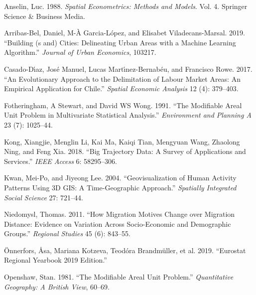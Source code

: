 \documentclass[
  letterpaper,
  krantz2]{style/krantz}
\newlength{\cslhangindent}
\newlength{\cslentryspacingunit} %
\newenvironment{CSLReferences}[2] %
 {%
  \setlength{\parindent}{0pt}
  \ifodd #1
  \let\oldpar\par
  \def\par{\hangindent=\cslhangindent\oldpar}
  \fi
  \setlength{\parskip}{#2\cslentryspacingunit}
 }%
 {}
\begin{document}
\hypertarget{refs}{}
\begin{CSLReferences}{1}{0}
\leavevmode{}%
Anselin, Luc. 1988. \emph{Spatial Econometrics: Methods and Models}.
Vol. 4. Springer Science \& Business Media.

\leavevmode{}%
Arribas-Bel, Daniel, M-À Garcia-López, and Elisabet Viladecans-Marsal.
2019. {``Building (s and) Cities: Delineating Urban Areas with a Machine
Learning Algorithm.''} \emph{Journal of Urban Economics}, 103217.

\leavevmode{}%
Casado-Dı́az, José Manuel, Lucas Martı́nez-Bernabéu, and Francisco Rowe.
2017. {``An Evolutionary Approach to the Delimitation of Labour Market
Areas: An Empirical Application for Chile.''} \emph{Spatial Economic
Analysis} 12 (4): 379--403.

\leavevmode{}%
Fotheringham, A Stewart, and David WS Wong. 1991. {``The Modifiable
Areal Unit Problem in Multivariate Statistical Analysis.''}
\emph{Environment and Planning A} 23 (7): 1025--44.

\leavevmode{}%
Kong, Xiangjie, Menglin Li, Kai Ma, Kaiqi Tian, Mengyuan Wang, Zhaolong
Ning, and Feng Xia. 2018. {``Big Trajectory Data: A Survey of
Applications and Services.''} \emph{IEEE Access} 6: 58295--306.

\leavevmode{}%
Kwan, Mei-Po, and Jiyeong Lee. 2004. {``Geovisualization of Human
Activity Patterns Using 3D GIS: A Time-Geographic Approach.''}
\emph{Spatially Integrated Social Science} 27: 721--44.

\leavevmode{}%
Niedomysl, Thomas. 2011. {``How Migration Motives Change over Migration
Distance: Evidence on Variation Across Socio-Economic and Demographic
Groups.''} \emph{Regional Studies} 45 (6): 843--55.

\leavevmode{}%
Önnerfors, Åsa, Mariana Kotzeva, Teodóra Brandmüller, et al. 2019.
{``Eurostat Regional Yearbook 2019 Edition.''}

\leavevmode{}%
Openshaw, Stan. 1981. {``The Modifiable Areal Unit Problem.''}
\emph{Quantitative Geography: A British View}, 60--69.


\end{CSLReferences}
\end{document}
